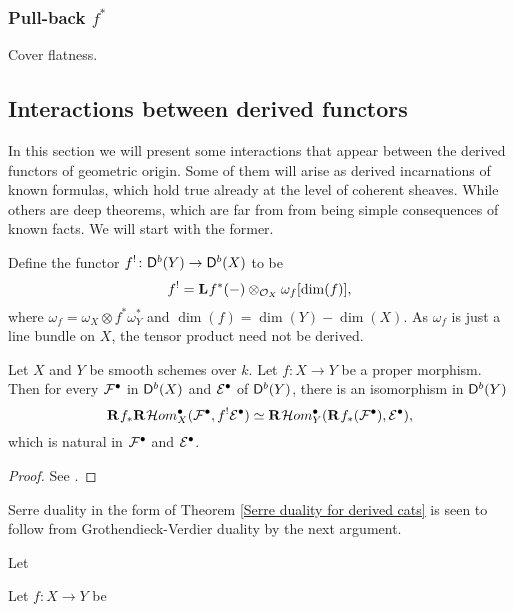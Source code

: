\subsubsection{Pull-back $f^*$}

Cover flatness.

\subsection{Interactions between derived functors}
\label{Subsection: Interactions between derived functors}

In this section we will present some interactions that appear between the derived functors of geometric origin. Some of them will arise as derived incarnations of known formulas, which hold true already at the level of coherent sheaves. While others are deep theorems, which are far from from being simple consequences of known facts. We will start with the former.


Define the functor $f^! \colon \mathsf{D}^b(Y) \to \mathsf{D}^b(X)$ to be
\[
    f^! = \mathbf{L}^{}f^*(-) \otimes_{{\mathcal{O}_{X}}} \omega_f[\dim(f)],
\]
where $\omega_f = \omega_X \otimes f^*\omega_Y^*$ and $\dim(f) = \dim(Y) - \dim(X)$. As $\omega_f$ is just a line bundle on $X$, the tensor product need not be derived. 

\begin{theorem}
    \label{Grothendieck-Verdier duality}
    Let $X$ and $Y$ be smooth schemes over $k$. Let $f \colon X \to Y$ be a proper morphism. Then for every $\mathcal F^\bullet$ in $\mathsf{D}^b(X)$ and $\mathcal E^\bullet$ of $\mathsf{D}^b(Y)$, there is an isomorphism in $\mathsf{D}^b(Y)$
    \[
        \rderived{}{f_*}\rderived{}{\localhom^\bullet_X}(\F^\bullet, f^! \E^\bullet) \iso \rderived{}{\localhom^\bullet_Y}(\rderived{}{f_*}(\F^\bullet), \E^\bullet),
    \]
    which is natural in $\mathcal F^\bullet$ and $\mathcal E^\bullet$.
\end{theorem}

\begin{proof}
    See \cite[Chapter VII, \S 4, Corollary 4.3]{Hartshorne1966}.
\end{proof}

\begin{remark}
    Serre duality in the form of Theorem \ref{Serre duality for derived cats} is seen to follow from Grothendieck-Verdier duality by the next argument.
\end{remark}

\begin{proposition}
    \label{flat base change formula}
    Let
\end{proposition}

\begin{proposition}
    \label{projection formula}
    Let $f \colon X \to Y$ be 
\end{proposition}